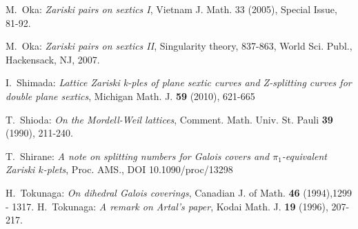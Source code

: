 \documentclass{article}
\begin{document}
\begin{thebibliography}{99}
M.~Oka: \emph{Zariski pairs on sextics I}, Vietnam J. Math. 33 (2005), Special Issue, 81-92.



 M.~Oka: \emph{Zariski pairs on sextics II},  Singularity theory, 837-863, World Sci. Publ., 
Hackensack, NJ, 2007. 
%


%
%

 I.~Shimada: \emph{Lattice Zariski k-ples of plane sextic curves and Z-splitting curves for double plane sextics}, 
Michigan Math. J. {\bf 59} (2010),  621-665

  T.~Shioda: \emph{On the Mordell-Weil lattices}, \rm Comment. Math. Univ. St. Pauli
\textbf{39} (1990), 211-240.  

%
%
%
%
%
 T.~Shirane: \emph{A note on splitting numbers for
Galois covers and $\pi_1$-equivalent Zariski $k$-plets}, Proc. AMS., DOI 10.1090/proc/13298
%


 H.~Tokunaga:  \emph{On dihedral Galois coverings}, \rm Canadian J. of
Math. {\bf 46} \rm (1994),1299 - 1317.
%
 H.~Tokunaga: \emph{A remark on Artal's paper}, \rm Kodai Math. J. {\bf 19} (1996), 207-217.
%
%


\end{thebibliography}
\end{document}
